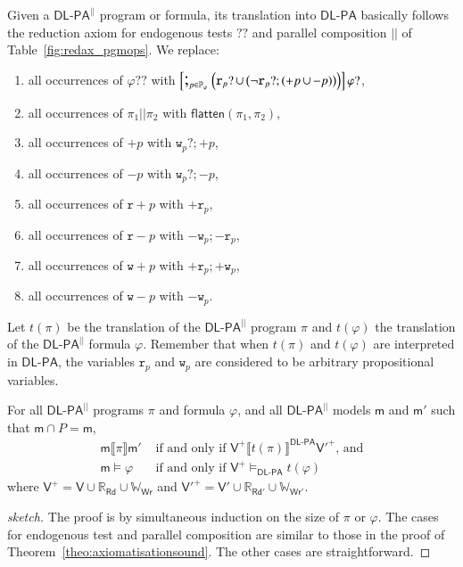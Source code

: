 \documentclass{llncs}
\newcommand{\progFlatten}{\mathsf{flatten}}
\newcommand{\modl}{\mathsf m}
\newcommand{\pll}{ {||} }							%
\newcommand{\readOf}[1]{\mathbb{R}_{#1}}
\newcommand{\readable}[1]{\mathtt{r}_{#1}}
\newcommand{\readset}{\mathsf{Rd}}
\newcommand{\valuset}{\mathsf{V}}
\newcommand{\writable}[1]{\mathtt{w}_{#1}}
\newcommand{\writeset}{\mathsf{Wr}}
\newcommand{\testendo}{?\!\!?}			%
\newcommand{\testpdl}{?}				%
\newcommand{\writeOf}[1]{\mathbb{W}_{#1}}
\newcommand{\Dlpa}{\ensuremath{\mathsf{DL\text{-}PA}}\xspace}
\newcommand{\DlpaPll}{\ensuremath{\mathsf{DL\text{-}PA}^\pll}\xspace}
\newcommand{\assgntop}[1]{{\mathtt {+} #1}}
\newcommand{\assgnbot}[1]{{\mathtt {-} #1}}
\newcommand{\assgntopR}[1]{{\mathtt r {+} #1}}
\newcommand{\assgnbotR}[1]{{\mathtt r {-} #1}}
\newcommand{\assgntopW}[1]{{\mathtt w {+} #1}}
\newcommand{\assgnbotW}[1]{{\mathtt w {-} #1}}
\newcommand{\assgntopV}[1]{{\mathtt {+} #1}}
\newcommand{\assgnbotV}[1]{{\mathtt {-} #1}}
\newcommand{\intPgm}[1]{\llbracket #1 \rrbracket}
\newcommand{\ndet}{\,{\cup}\,}
\renewcommand{\phi}{\varphi}
\newcommand{\propset}{\mathbb P}
\newcommand{\propsetOf}[1]{\propset_{#1}}
\newcommand{\modinter}{\cap}
\newcommand{\seqseq}[1]{ \text{\Large ;}_{#1} ~ }
\begin{document}
Given a \DlpaPll program or formula, its translation into \Dlpa basically follows the reduction axiom for endogenous tests $\testendo$ and parallel composition $ \pll $ of Table~\ref{fig:redax_pgmops}. 
We replace:
\begin{enumerate}
\item
all occurrences of $\phi \testendo $ with 
$\left[\seqseq{p \in \propsetOf \phi} \Big(
\readable{p} \testpdl \ndet \big( \lnot \readable{p} \testpdl ; (\assgntopV{p} \ndet \assgnbotV{p}) \big) 
\Big)\right] \phi \testpdl $,
\item
all occurrences of $ \pi_1 \pll \pi_2 $ with $\progFlatten(\pi_1, \pi_2)$,
\item
all occurrences of $\assgntopV p$ with $\writable p ? ; \assgntopV p$,
\item
all occurrences of $\assgnbotV p$ with $\writable p ? ; \assgnbotV p$,
\item
all occurrences of $\assgntopR{p}$ with $\assgntop{ \readable{p}}$,
\item
all occurrences of $\assgnbotR{p}$ with $\assgnbot{ \writable{p}} ; \assgnbot{ \readable{p}}$,
\item
all occurrences of $\assgntopW{p}$ with $\assgntop{ \readable{p}} ; \assgntop{ \writable{p}}$,
\item
all occurrences of $\assgnbotW{p}$ with $\assgnbot{ \writable{p}}$.
\end{enumerate}
Let $t(\pi)$ be the translation of the \DlpaPll program $\pi$ and
$t(\phi)$ the translation of the \DlpaPll formula $\phi$.
Remember that when $t(\pi)$ and $t(\phi)$ are interpreted in \Dlpa, the variables $\readable p$ and $\writable{p}$ 
are considered to be arbitrary propositional variables. 

\begin{lemma}\label{lem:dlpatradcorrect}
For all \DlpaPll programs $\pi$ and formula $\phi$, and all \DlpaPll models $\modl$ and $\modl'$ such that $\modl \modinter P = \modl$,
\begin{align*}
  \modl \intPgm{\pi} \modl' &\text{ if and only if } \valuset^+ \intPgm{t(\pi)}^{\Dlpa} \valuset'^+ \text{, and} \\
  \modl \models \phi        &\text{ if and only if } \valuset^+ \models_{\Dlpa} t(\phi)
\end{align*}
where $\valuset^+  = \valuset  \cup \readOf{\readset } \cup \writeOf{\writeset }$
and   $\valuset'^+ = \valuset' \cup \readOf{\readset'} \cup \writeOf{\writeset'}$.
\end{lemma}
\begin{proof}[sketch]
The proof is by simultaneous induction on the size of $\pi$ or $\phi$.
The cases for endogenous test and parallel composition are similar to those in the proof of Theorem~\ref{theo:axiomatisationsound}.
The other cases are straightforward.
\end{proof}
\end{document}
